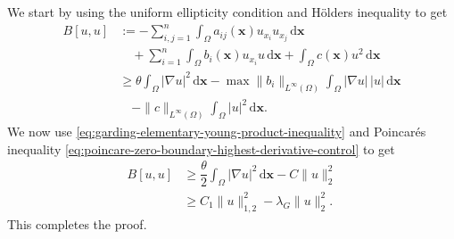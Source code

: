 \begin{Proof}
We start by using the uniform ellipticity condition and Hölder\textquotesingle s inequality to get\[\begin{aligned}
B[u,u]&:=-\sum_{i,j=1}^n\int_\Omega a_{ij}(\bm{x})u_{x_i}u_{x_j}\,\mathrm{d}\bm{x}\\
&\quad+\sum_{i=1}^n\int_\Omega b_i(\bm{x})u_{x_i}u\,\mathrm{d}\bm{x}+\int_\Omega c(\bm{x})u^2\,\mathrm{d}\bm{x}\\
&\geq\theta\int_\Omega|\nabla u|^2\,\mathrm{d}\bm{x}-\max\|b_i\|_{L^\infty(\Omega)}\int_\Omega|\nabla u|\,|u|\,\mathrm{d}\bm{x}\\
&\quad-\|c\|_{L^\infty(\Omega)}\int_\Omega|u|^2\,\mathrm{d}\bm{x}.
\end{aligned}\]We now use \eqref{eq:garding-elementary-young-product-inequality} and Poincaré\textquotesingle s inequality \eqref{eq:poincare-zero-boundary-highest-derivative-control} to get\[\begin{aligned}
B[u,u]&\geq\dfrac{\theta}{2}\int_\Omega|\nabla u|^2\,\mathrm{d}\bm{x}-C\|u\|_2^2\\
&\geq C_1\|u\|_{1,2}^2-\lambda_G\|u\|_2^2.
\end{aligned}\]This completes the proof.
\end{Proof}
